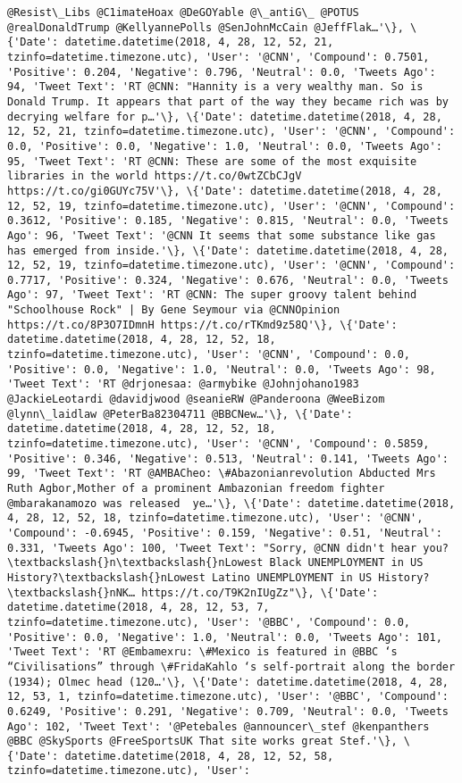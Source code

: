 \documentclass[11pt]{article}
\begin{document}
\begin{Verbatim}[commandchars=\\\{\}]
@Resist\_Libs @C1imateHoax @DeGOYable @\_antiG\_ @POTUS @realDonaldTrump @KellyannePolls @SenJohnMcCain @JeffFlak…'\}, \{'Date': datetime.datetime(2018, 4, 28, 12, 52, 21, tzinfo=datetime.timezone.utc), 'User': '@CNN', 'Compound': 0.7501, 'Positive': 0.204, 'Negative': 0.796, 'Neutral': 0.0, 'Tweets Ago': 94, 'Tweet Text': 'RT @CNN: "Hannity is a very wealthy man. So is Donald Trump. It appears that part of the way they became rich was by decrying welfare for p…'\}, \{'Date': datetime.datetime(2018, 4, 28, 12, 52, 21, tzinfo=datetime.timezone.utc), 'User': '@CNN', 'Compound': 0.0, 'Positive': 0.0, 'Negative': 1.0, 'Neutral': 0.0, 'Tweets Ago': 95, 'Tweet Text': 'RT @CNN: These are some of the most exquisite libraries in the world https://t.co/0wtZCbCJgV https://t.co/gi0GUYc75V'\}, \{'Date': datetime.datetime(2018, 4, 28, 12, 52, 19, tzinfo=datetime.timezone.utc), 'User': '@CNN', 'Compound': 0.3612, 'Positive': 0.185, 'Negative': 0.815, 'Neutral': 0.0, 'Tweets Ago': 96, 'Tweet Text': '@CNN It seems that some substance like gas has emerged from inside.'\}, \{'Date': datetime.datetime(2018, 4, 28, 12, 52, 19, tzinfo=datetime.timezone.utc), 'User': '@CNN', 'Compound': 0.7717, 'Positive': 0.324, 'Negative': 0.676, 'Neutral': 0.0, 'Tweets Ago': 97, 'Tweet Text': 'RT @CNN: The super groovy talent behind "Schoolhouse Rock" | By Gene Seymour via @CNNOpinion https://t.co/8P3O7IDmnH https://t.co/rTKmd9z58Q'\}, \{'Date': datetime.datetime(2018, 4, 28, 12, 52, 18, tzinfo=datetime.timezone.utc), 'User': '@CNN', 'Compound': 0.0, 'Positive': 0.0, 'Negative': 1.0, 'Neutral': 0.0, 'Tweets Ago': 98, 'Tweet Text': 'RT @drjonesaa: @armybike @Johnjohano1983 @JackieLeotardi @davidjwood @seanieRW @Panderoona @WeeBizom @lynn\_laidlaw @PeterBa82304711 @BBCNew…'\}, \{'Date': datetime.datetime(2018, 4, 28, 12, 52, 18, tzinfo=datetime.timezone.utc), 'User': '@CNN', 'Compound': 0.5859, 'Positive': 0.346, 'Negative': 0.513, 'Neutral': 0.141, 'Tweets Ago': 99, 'Tweet Text': 'RT @AMBACheo: \#Abazonianrevolution Abducted Mrs Ruth Agbor,Mother of a prominent Ambazonian freedom fighter @mbarakanamozo was released  ye…'\}, \{'Date': datetime.datetime(2018, 4, 28, 12, 52, 18, tzinfo=datetime.timezone.utc), 'User': '@CNN', 'Compound': -0.6945, 'Positive': 0.159, 'Negative': 0.51, 'Neutral': 0.331, 'Tweets Ago': 100, 'Tweet Text': "Sorry, @CNN didn't hear you?\textbackslash{}n\textbackslash{}nLowest Black UNEMPLOYMENT in US History?\textbackslash{}nLowest Latino UNEMPLOYMENT in US History?\textbackslash{}nNK… https://t.co/T9K2nIUgZz"\}, \{'Date': datetime.datetime(2018, 4, 28, 12, 53, 7, tzinfo=datetime.timezone.utc), 'User': '@BBC', 'Compound': 0.0, 'Positive': 0.0, 'Negative': 1.0, 'Neutral': 0.0, 'Tweets Ago': 101, 'Tweet Text': 'RT @Embamexru: \#Mexico is featured in @BBC ‘s “Civilisations” through \#FridaKahlo ‘s self-portrait along the border (1934); Olmec head (120…'\}, \{'Date': datetime.datetime(2018, 4, 28, 12, 53, 1, tzinfo=datetime.timezone.utc), 'User': '@BBC', 'Compound': 0.6249, 'Positive': 0.291, 'Negative': 0.709, 'Neutral': 0.0, 'Tweets Ago': 102, 'Tweet Text': '@Petebales @announcer\_stef @kenpanthers @BBC @SkySports @FreeSportsUK That site works great Stef.'\}, \{'Date': datetime.datetime(2018, 4, 28, 12, 52, 58, tzinfo=datetime.timezone.utc), 'User': 
\end{Verbatim}
\end{document}
